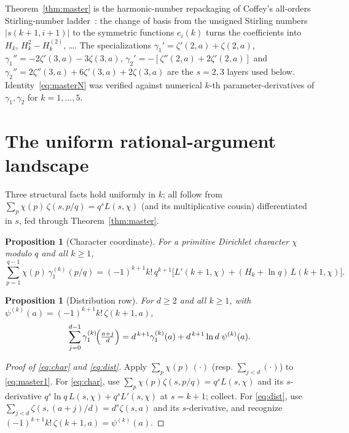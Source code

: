 \documentclass[11pt]{article}
\newtheorem{proposition}[theorem]{Proposition}
\theoremstyle{remark}
\newcommand{\h}[1]{H_{#1}}
\begin{document}
Theorem~\ref{thm:master} is the harmonic-number repackaging of Coffey's
all-orders Stirling-number ladder~\cite{Coffey2009}: the change of basis from
the unsigned Stirling numbers $\bigl|s(k{+}1,i{+}1)\bigr|$ to the symmetric
functions $e_i(k)$ turns the coefficients into $\h{k}$, $\h{k}^2-\h{k}^{(2)}$,
\dots. The specializations $\gamma_1'=\zeta'(2,a)+\zeta(2,a)$,
$\gamma_1''=-2\zeta'(3,a)-3\zeta(3,a)$,
$\gamma_2'=-[\zeta''(2,a)+2\zeta'(2,a)]$ and
$\gamma_2''=2\zeta''(3,a)+6\zeta'(3,a)+2\zeta(3,a)$ are the $s=2,3$ layers used
below. Identity~\eqref{eq:masterN} was verified against numerical $k$-th
parameter-derivatives of $\gamma_1,\gamma_2$ for $k=1,\dots,5$.

\section{The uniform rational-argument landscape}\label{sec:landscape}

Three structural facts hold uniformly in $k$; all follow from
$\sum_{p}\chi(p)\,\zeta(s,p/q)=q^{s}L(s,\chi)$ (and its multiplicative cousin)
differentiated in $s$, fed through Theorem~\ref{thm:master}.

\begin{proposition}[Character coordinate]\label{prop:char}
For a primitive Dirichlet character $\chi$ modulo $q$ and all $k\ge1$,
\begin{equation}\label{eq:char}
  \sum_{p=1}^{q-1}\chi(p)\,\gamma_1^{(k)}(p/q)
   =(-1)^{k+1}k!\,q^{k+1}\bigl[L'(k{+}1,\chi)+(\h{k}+\ln q)\,L(k{+}1,\chi)\bigr].
\end{equation}
\end{proposition}

\begin{proposition}[Distribution row]\label{prop:dist}
For $d\ge2$ and all $k\ge1$, with $\psi^{(k)}(a)=(-1)^{k+1}k!\,\zeta(k{+}1,a)$,
\begin{equation}\label{eq:dist}
  \sum_{j=0}^{d-1}\gamma_1^{(k)}\!\Bigl(\tfrac{a+j}{d}\Bigr)
   =d^{\,k+1}\gamma_1^{(k)}(a)+d^{\,k+1}\ln d\;\psi^{(k)}(a).
\end{equation}
\end{proposition}

\begin{proof}[Proof of \eqref{eq:char} and \eqref{eq:dist}]
Apply $\sum_p\chi(p)\,(\cdot)$ (resp. $\sum_{j<d}(\cdot)$) to
\eqref{eq:master1}. For \eqref{eq:char}, use
$\sum_p\chi(p)\zeta(s,p/q)=q^sL(s,\chi)$ and its $s$-derivative
$q^s\ln q\,L(s,\chi)+q^sL'(s,\chi)$ at $s=k{+}1$; collect. For \eqref{eq:dist},
use $\sum_{j<d}\zeta(s,(a{+}j)/d)=d^s\zeta(s,a)$ and its $s$-derivative, and
recognize $(-1)^{k+1}k!\,\zeta(k{+}1,a)=\psi^{(k)}(a)$.
\end{proof}
\end{document}
